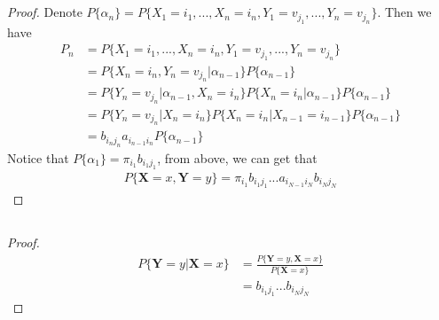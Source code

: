 \documentclass[runningheads]{llncs}
\begin{document}
    \subsection{}
    \begin{proof}
        Denote $P \{ \alpha_n \} = P \{ X_1 = i_1,..., X_n = i_n, Y_1 = v_{j_1},..., Y_n = v_{j_n} \}$.
        Then we have
        \begin{align}
            P_n &= P \{ X_1 = i_1,..., X_n = i_n, Y_1 = v_{j_1},..., Y_n = v_{j_n} \} \\
            &= P \{X_n = i_n, Y_n = v_{j_n} |\alpha_{n-1} \} P \{\alpha_{n-1} \} \\
            &= P \{Y_n = v_{j_n} | \alpha_{n-1}, X_n = i_n \} P \{X_n = i_n |\alpha_{n-1} \} P \{\alpha_{n-1} \} \\
            &= P \{Y_n = v_{j_n} | X_n = i_n \} P \{X_n = i_n | X_{n-1} = i_{n-1} \} P \{\alpha_{n-1} \} \\
            &= b_{i_n j_n} a_{i_{n-1} i_n} P \{ \alpha_{n-1} \}
        \end{align}
        Notice that $P \{ \alpha_1 \} = \pi_{i_1} b_{i_1 j_1}$, from
        above, we can get that
        \begin{align}
            P \{ \mathbf{X} = x, \mathbf{Y} = y \} = \pi_{i_1} b_{i_1 j_1} ...
             a_{i_{N-1} i_N} b_{i_N j_N}
        \end{align}
    \end{proof}
    \subsection{}
    \begin{proof}
        \begin{align}
            P \{ \mathbf{Y} = y | \mathbf{X} = x \} &= 
            \frac{P \{ \mathbf{Y} = y, \mathbf{X} = x \}}{P \{ \mathbf{X} = x\}} \\
            &= b_{i_1 j_1}...b_{i_N j_N}
        \end{align}
    \end{proof}
\end{document}
